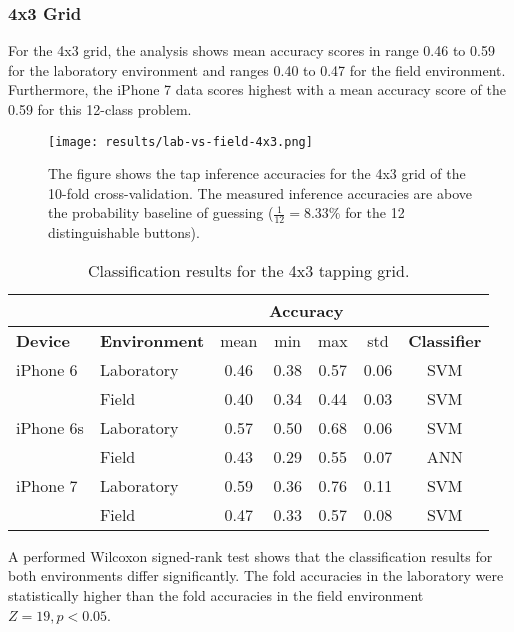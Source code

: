 \subsubsection{4x3 Grid}

For the 4x3 grid, the analysis shows mean accuracy scores in range 0.46 to 0.59 for the laboratory environment and ranges 0.40 to 0.47 for the field environment. Furthermore, the iPhone 7 data scores highest with a mean accuracy score of the 0.59 for this 12-class problem.

\begin{figure}[h!]
  \centering
  \texttt{[image: results/lab-vs-field-4x3.png]}
  \caption{The figure shows the tap inference accuracies for the 4x3 grid of the 10-fold cross-validation. The measured inference accuracies are above the probability baseline of guessing ($\frac{1}{12}= 8.33\%$ for the 12 distinguishable buttons).} \label{fig:participation}
\end{figure}

\begin{table}[h!]
  \centering
\begin{tabular}{|l|l|c|c|c|c|c|}
  \cline{3-6}
  \multicolumn{2}{c}{} & \multicolumn{4}{|c|}{\textbf{Accuracy}}  \\
  \hline
  \textbf{Device} & \textbf{Environment} & mean &   min &   max  & std &  \textbf{Classifier} \\
  \hline
  iPhone 6 & Laboratory &      0.46 &     0.38 &     0.57 &     0.06 &  SVM \\
  & Field &      0.40 &     0.34 &     0.44 &     0.03 &  SVM \\
  \hline
iPhone 6s  & Laboratory &      0.57 &     0.50 &     0.68 &     0.06 &  SVM \\
 &   Field    &      0.43 &     0.29 &     0.55 &     0.07 &  ANN \\
 \hline
iPhone 7   & Laboratory &      0.59 &     0.36 &     0.76 &     0.11 &  SVM \\
& Field &      0.47 &     0.33 &     0.57 &     0.08 &  SVM \\
  \hline
\end{tabular}
  \caption{Classification results for the 4x3 tapping grid.}
\end{table}

A performed Wilcoxon signed-rank test shows that the classification results for both environments differ significantly. The fold accuracies in the laboratory were statistically higher than the fold accuracies in the field environment $Z = 19, p < 0.05$.

